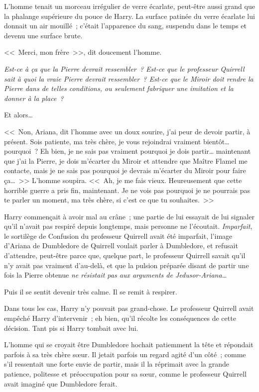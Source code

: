 L'homme tenait un morceau irrégulier de verre écarlate, peut-être aussi grand que la phalange supérieure du pouce de Harry. La surface patinée du verre écarlate lui donnait un air mouillé~; c'était l'apparence du sang, suspendu dans le temps et devenu une surface brute.

<<~Merci, mon frère~>>, dit doucement l'homme.

\emph{Est-ce à ça que la Pierre devrait ressembler~? Est-ce que le professeur Quirrell sait à quoi la vraie Pierre devrait ressembler~? Est-ce que le Miroir doit rendre la Pierre dans de telles conditions, ou seulement fabriquer une imitation et la donner à la place~?}

Et alors…

<<~Non, Ariana, dit l'homme avec un doux sourire, j'ai peur de devoir partir, à présent. Sois patiente, ma très chère, je vous rejoindrai vraiment bientôt… pourquoi~? Eh bien, je ne sais pas vraiment pourquoi je dois partir… maintenant que j'ai la Pierre, je dois m'écarter du Miroir et attendre que Maître Flamel me contacte, mais je ne sais pas pourquoi je devrais m'écarter du Miroir pour faire ça…~>> L'homme soupira. <<~Ah, je me fais vieux. Heureusement que cette horrible guerre a pris fin, maintenant. Je ne vois pas pourquoi je ne pourrais pas te parler un moment, ma très chère, si c'est ce que tu souhaites.~>>

Harry commençait à avoir mal au crâne~; une partie de lui essayait de lui signaler qu'il n'avait pas respiré depuis longtemps, mais personne ne l'écoutait. \emph{Imparfait}, le sortilège de Confusion du professeur Quirrell avait été imparfait, l'image d'Ariana de Dumbledore de Quirrell voulait parler à Dumbledore, et refusait d'attendre, peut-être parce que, quelque part, le professeur Quirrell savait qu'il n'y avait pas vraiment d'au-delà, et que la pulsion préparée disant de partir une fois la Pierre obtenue \emph{ne résistait pas aux arguments de Jedusor-Ariana…}

Puis il se sentit devenir très calme. Il se remit à respirer.

Dans tous les cas, Harry n'y pouvait pas grand-chose. Le professeur Quirrell avait empêché Harry d'intervenir~; eh bien, qu'il récolte les conséquences de cette décision. Tant pis si Harry tombait avec lui.

L'homme qui se croyait être Dumbledore hochait patiemment la tête et répondait parfois à sa très chère sœur. Il jetait parfois un regard agité d'un côté~; comme s'il ressentait une forte envie de partir, mais il la réprimait avec la grande patience, politesse et préoccupation pour sa sœur, comme le professeur Quirrell avait imaginé que Dumbledore ferait.

